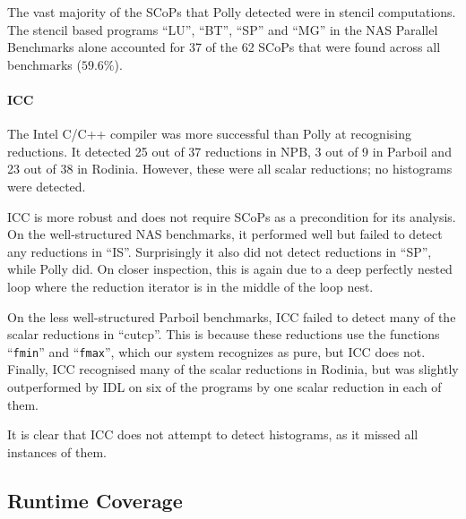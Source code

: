     The vast majority of the SCoPs that Polly detected were in stencil
    computations.
    The stencil based programs ``LU'', ``BT'', ``SP'' and ``MG'' in the NAS
    Parallel Benchmarks alone accounted for 37 of the 62 SCoPs that were found
    across all benchmarks ($59.6\%$). 

    \paragraph*{ICC}
    The Intel C/C++ compiler was more successful than Polly at recognising
    reductions.
    It detected 25 out of 37 reductions in NPB, 3 out of 9 in Parboil and
    23 out of 38 in Rodinia.
    However, these were all scalar reductions; no histograms were detected.

    ICC is more robust and does not require SCoPs as a precondition for its
    analysis.
    On the well-structured NAS benchmarks, it performed well but failed to
    detect any reductions in ``IS''.
    Surprisingly it also did not detect reductions in ``SP'', while Polly did.
    On closer inspection, this is again due to a deep perfectly nested loop
    where the reduction iterator is in the middle of the loop nest.

    On the less well-structured Parboil benchmarks, ICC failed to detect many of
    the scalar reductions in ``cutcp''.
    This is because these reductions use the functions ``\texttt{fmin}'' and
    ``\texttt{fmax}'', which our system recognizes as pure, but ICC does not.
    Finally, ICC recognised many of the scalar reductions in Rodinia, but was
    slightly outperformed by IDL on six of the programs by one scalar reduction
    in each of them.

    It is clear that ICC does not attempt to detect histograms, as it missed all
    instances of them.

\subsection{Runtime Coverage}

